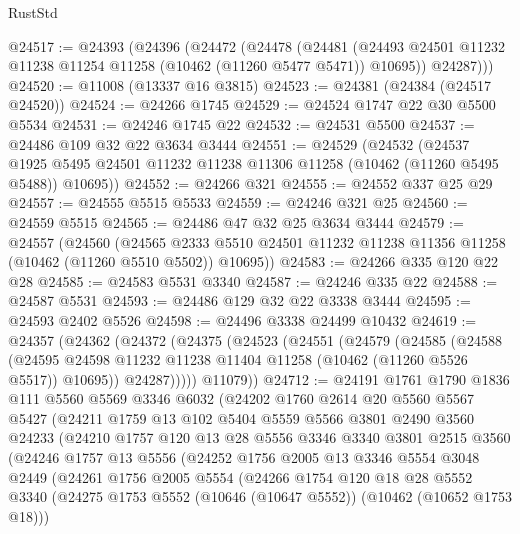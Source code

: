 \begin{lexlean}{RustStd}
\begin{coremodule}
@24517 := @24393
    (@24396
      (@24472
        (@24478
          (@24481 (@24493 @24501 @11232 @11238 @11254 @11258 (@10462 (@11260 @5477 @5471)) @10695))
          @24287)))
@24520 := @11008 (@13337 @16 @3815)
@24523 := @24381 (@24384 (@24517 @24520))
@24524 := @24266 @1745
@24529 := @24524 @1747 @22 @30 @5500 @5534
@24531 := @24246 @1745 @22
@24532 := @24531 @5500
@24537 := @24486 @109 @32 @22 @3634 @3444
@24551 := @24529
    (@24532
      (@24537 @1925 @5495 @24501 @11232 @11238 @11306 @11258 (@10462 (@11260 @5495 @5488)) @10695))
@24552 := @24266 @321
@24555 := @24552 @337 @25 @29
@24557 := @24555 @5515 @5533
@24559 := @24246 @321 @25
@24560 := @24559 @5515
@24565 := @24486 @47 @32 @25 @3634 @3444
@24579 := @24557
    (@24560
      (@24565 @2333 @5510 @24501 @11232 @11238 @11356 @11258 (@10462 (@11260 @5510 @5502)) @10695))
@24583 := @24266 @335 @120 @22 @28
@24585 := @24583 @5531 @3340
@24587 := @24246 @335 @22
@24588 := @24587 @5531
@24593 := @24486 @129 @32 @22 @3338 @3444
@24595 := @24593 @2402 @5526
@24598 := @24496 @3338 @24499 @10432
@24619 := @24357
    (@24362
      (@24372
        (@24375
          (@24523
            (@24551
              (@24579
                (@24585
                  (@24588
                    (@24595
                      @24598
                      @11232
                      @11238
                      @11404
                      @11258
                      (@10462 (@11260 @5526 @5517))
                      @10695))
                  @24287)))))
        @11079))
@24712 := @24191
    @1761
    @1790
    @1836
    @111
    @5560
    @5569
    @3346
    @6032
    (@24202
      @1760
      @2614
      @20
      @5560
      @5567
      @5427
      (@24211
        @1759
        @13
        @102
        @5404
        @5559
        @5566
        @3801
        @2490
        @3560
        @24233
        (@24210
          @1757
          @120
          @13
          @28
          @5556
          @3346
          @3340
          @3801
          @2515
          @3560
          (@24246
            @1757
            @13
            @5556
            (@24252
              @1756
              @2005
              @13
              @3346
              @5554
              @3048
              @2449
              (@24261
                @1756
                @2005
                @5554
                (@24266
                  @1754
                  @120
                  @18
                  @28
                  @5552
                  @3340
                  (@24275 @1753 @5552 (@10646 (@10647 @5552)) (@10462 (@10652 @1753 @18)))

\end{coremodule}
\end{lexlean}
